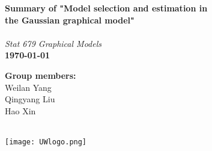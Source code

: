 
\begin{minipage}[b]{0.55\linewidth}
\Huge \color{NavyBlue} \textbf{Summary of "Model selection and estimation in \\ the Gaussian graphical model"} \color{Black}\\ %
\\[0.5cm] 
\Large \textit{Stat 679 Graphical Models}\\[0.5cm] %
\large \textbf{\today}\\ %
\end{minipage}
%
%
\begin{minipage}[b]{0.25\linewidth}
\color{DarkSlateGray}\Large \textbf{Group members:}\\
Weilan Yang\\ 
Qingyang Liu\\
Hao Xin\\\\
\end{minipage}
%
\begin{minipage}[b]{0.19\linewidth}
\texttt{[image: UWlogo.png]} %
\end{minipage}

\vspace{0.5cm} %

